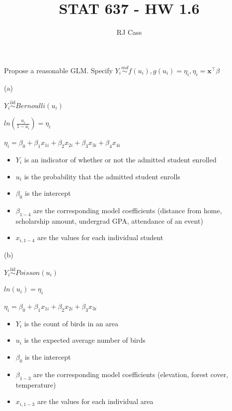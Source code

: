 \documentclass{article}
\author{RJ Cass}
\title{STAT 637 - HW 1.6}
\newcommand{\iiddist}{\overset{\mathrm{iid}}{\sim}}
\begin{document}
\maketitle



\section{}

Propose a reasonable GLM. Specify $Y_i \overset{ind}{\sim} f(u_i), g(u_i) = \eta_i, \eta_i = \bm{x}^{\top}\beta$

(a)

$Y_i \iiddist Bernoulli(u_i)$

$ln(\frac{u_i}{1 - u_i}) = \eta_i$

$\eta_i = \beta_0 + \beta_1 x_{1i} + \beta_2 x_{2i} + \beta_3 x_{3i} + \beta_4 x_{4i}$

\begin{itemize}
    \item $Y_i$ is an indicator of whether or not the admitted student enrolled
    \item $u_i$ is the probability that the admitted student enrolls
    \item $\beta_0$ is the intercept 
    \item $\beta_{1-4}$ are the corresponding model coefficients (distance from home, scholarship amount, undergrad GPA, attendance of an event)
    \item $x_{i, 1-4}$ are the values for each individual student
\end{itemize}

(b)

$Y_i \iiddist Poisson(u_i)$

$ln(u_i) = \eta_i$

$\eta_i = \beta_0 + \beta_1 x_{1i} + \beta_2 x_{2i} + \beta_3 x_{3i}$

\begin{itemize}
    \item $Y_i$ is the count of birds in an area
    \item $u_i$ is the expected average number of birds
    \item $\beta_0$ is the intercept 
    \item $\beta_{1-3}$ are the corresponding model coefficients (elevation, forest cover, temperature)
    \item $x_{i, 1-3}$ are the values for each individual area
\end{itemize}
\end{document}
